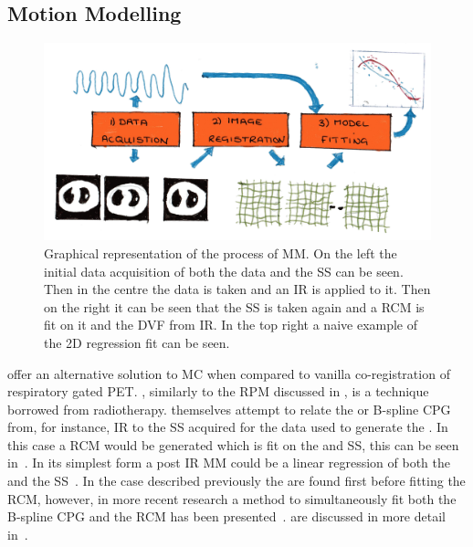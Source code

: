         \subsection{Motion Modelling} \label{sec:motion_modelling}
            \begin{figure}
                \centering
                        
                \includegraphics[width=1.0\linewidth]{figures/background_motion_model.png}
                        
                \captionsetup{singlelinecheck=false, justification=raggedright}
                \caption{Graphical representation of the process of \gls{MM}. On the left the initial data acquisition of both the data and the \gls{SS} can be seen. Then in the centre the data is taken and an \gls{IR} is applied to it. Then on the right it can be seen that the \gls{SS} is taken again and a \gls{RCM} is fit on it and the \gls{DVF} from \gls{IR}. In the top right a naive example of the \gls{2D} regression fit can be seen.} \label{fig:motion_modelling_motion_model}
            \end{figure}
            
             offer an alternative solution to \gls{MC} when compared to vanilla co-registration of respiratory gated \gls{PET}. , similarly to the \gls{RPM} discussed in , is a technique borrowed from radiotherapy.  themselves attempt to relate the  or B-spline \gls{CPG} from, for instance, \gls{IR} to the \gls{SS} acquired for the data used to generate the . In this case a \gls*{RCM} would be generated which is fit on the  and \gls{SS}, this can be seen in~. In its simplest form a post \gls{IR} \gls{MM} could be a linear regression of both the  and the \gls{SS}~\parencite{Kim1997MotionModel}. In the case described previously the  are found first before fitting the \gls{RCM}, however, in more recent research a method to simultaneously fit both the B-spline \gls{CPG} and the \gls{RCM} has been presented~\parencite{McClelland2013, McClelland2006, McClelland2014, McClelland2017}.  are discussed in more detail in~.
            
